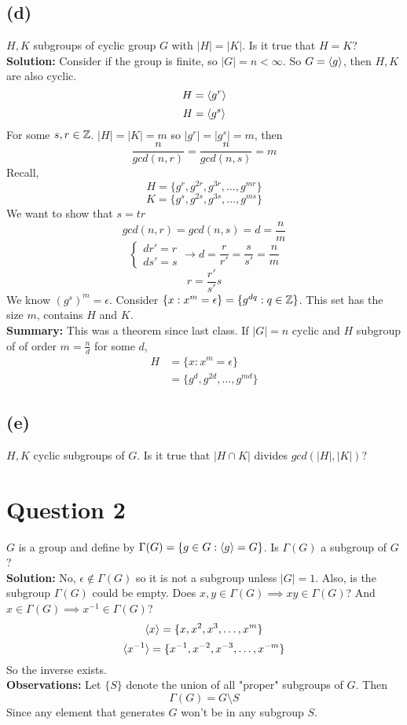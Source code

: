 \documentclass[openany]{report}
\begin{document}
\subsection{(d)} $H,K$ subgroups of cyclic group $G$ with $|H| = |K|$. Is it true that $H = K$?\\[3ex]
\textbf{Solution:} Consider if the group is finite, so $|G| = n < \infty$. So $G = \langle g \rangle$, then $H,K$ are also cyclic. $$H = \langle g^r \rangle$$
$$H = \langle g^s \rangle$$
For some $s,r \in \mathbb{Z}$. $|H| = |K| = m$ so $|g^r| = |g^s| = m$, then
$$\frac{n}{gcd(n,r)} = \frac{n}{gcd(n,s)} = m$$
Recall,
$$H = \{g^r, g^{2r},g^{3r}, \ldots, g^{mr} \}$$
$$K = \{g^s, g^{2s}, g^{3s}, \ldots, g^{ms}\}$$
We want to show that $s = tr$
$$gcd(n,r) = gcd(n,s) = d =\frac{n}{m}$$
$$\begin{cases}
dr' = r\\
ds' = s
\end{cases} \rightarrow d = \frac{r}{r'} = \frac{s}{s'} = \frac{n}{m}$$
$$r = \frac{r'}{s'} s$$
We know $(g^s)^m = \epsilon$. Consider $\{x: x^m = \epsilon\} = \{g^{dq} : q \in \mathbb{Z}\}$. This set has the size $m$, contains $H$ and $K$. \\[2ex]
\textbf{Summary:} This was a theorem since last class. If $|G| = n$ cyclic and $H$ subgroup of of order $m = \frac{n}{d}$ for some $d$,
\begin{align*}
    H &= \{x: x^m = \epsilon\} \\
    &= \{g^d, g^{2d}, \dots, g^{md}\}
\end{align*}

\subsection{(e)}
$H,K$ cyclic subgroups of $G$. Is it true that $|H \cap K|$ divides $gcd(|H|,|K|)$? \\[3ex]
\section{Question 2}
$G$ is a group and define by $\Gamma(G) = \{g \in G: \langle g \rangle = G\}$. Is $\Gamma(G)$ a subgroup of $G$?\\[3ex]
\textbf{Solution:}
No, $\epsilon \not\in \Gamma(G)$ so it is not a subgroup unless $|G| = 1$. Also, is the subgroup $\Gamma(G)$ could be empty. Does $x,y \in \Gamma(G) \implies xy \in \Gamma(G)$? And $x \in \Gamma(G) \implies x^{-1} \in \Gamma(G)$? 
$$\langle x \rangle = \{x, x^2,x^3, \dots, x^m\}$$
$$\langle x^{-1} \rangle = \{x^{-1}, x^{-2},x^{-3}, \dots, x^{-m}\}$$
So the inverse exists. \\[2ex]
\textbf{Observations:} Let $\{S\}$ denote the union of all "proper" subgroups of $G$. Then
$$\Gamma(G) = G \setminus S$$
Since any element that generates $G$ won't be in any subgroup $S$.
\end{document}
